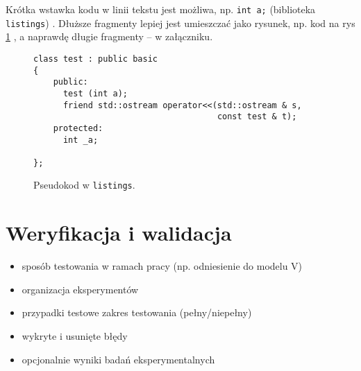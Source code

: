 \documentclass[a4paper,twoside,12pt]{book}
\begin{document}
Krótka wstawka kodu w linii tekstu jest możliwa, np.  \lstinline|int a;| (biblioteka \texttt{listings})%
. 
Dłuższe fragmenty lepiej jest umieszczać jako rysunek, np. kod na rys \ref{fig:pseudokod:listings}%
, a naprawdę długie fragmenty – w załączniku.


\begin{figure}
\centering
\begin{lstlisting}
class test : public basic
{
    public:
      test (int a);
      friend std::ostream operator<<(std::ostream & s, 
                                     const test & t);
    protected:
      int _a;  
      
};
\end{lstlisting}
\caption{Pseudokod w \texttt{listings}.}
\label{fig:pseudokod:listings}
\end{figure}

%      




%
%
%
\chapter{Weryfikacja i walidacja}
\label{ch:06}
\begin{itemize}
\item sposób testowania w ramach pracy (np. odniesienie do modelu V)
\item organizacja eksperymentów
\item przypadki testowe zakres testowania (pełny/niepełny)
\item wykryte i usunięte błędy
\item opcjonalnie wyniki badań eksperymentalnych
\end{itemize}
\end{document}

